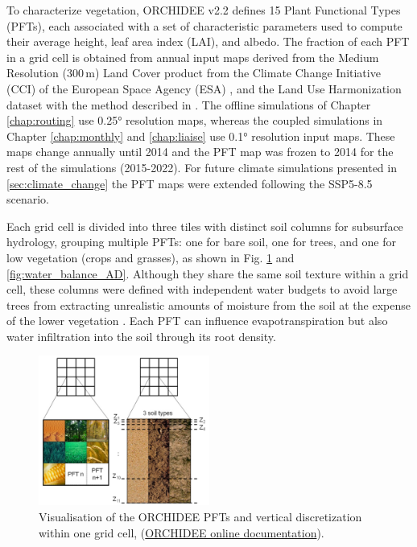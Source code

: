 To characterize vegetation, ORCHIDEE v2.2 defines 15 Plant Functional Types (PFTs), each associated with a set of characteristic parameters used to compute their average height, leaf area index (LAI), and albedo. 
The fraction of each PFT in a grid cell is obtained from annual input maps derived from the Medium Resolution (300\,m) Land Cover product from the Climate Change Initiative (CCI) of the European Space Agency (ESA) \citep{bontemps_multi-year_2015}, and the Land Use Harmonization dataset \citep[LUH, ][]{hurtt_harmonization_2020} with the method described in \citet{lurton_implementation_2020}.
The offline simulations of Chapter \ref{chap:routing} use 0.25° resolution maps, whereas the coupled simulations in Chapter \ref{chap:monthly} and \ref{chap:liaise} use 0.1° resolution input maps. These maps change annually until 2014 and the PFT map was frozen to 2014 for the rest of the simulations (2015-2022).
For future climate simulations presented in \ref{sec:climate_change} the PFT maps were extended following the SSP5-8.5 scenario.

Each grid cell is divided into three tiles with distinct soil columns for subsurface hydrology, grouping multiple PFTs: one for bare soil, one for trees, and one for low vegetation (crops and grasses), as shown in Fig. \ref{fig:ORC_discretization} and \ref{fig:water_balance_AD}. 
Although they share the same soil texture within a grid cell, these columns were 
defined with independent water budgets to avoid large trees from extracting unrealistic amounts of moisture from the soil at the expense of the lower vegetation \citep{de1999representation}. Each PFT can influence evapotranspiration but also water infiltration into the soil through its root density.

\begin{figure}[hbtp]
    \centering
    \includegraphics[width=0.5\textwidth]{images/methods/ORC_discretization.png}
    \caption{Visualisation of the ORCHIDEE PFTs and vertical discretization within one grid cell, (\href{https://orchidee.ipsl.fr/introduction/}{ORCHIDEE online documentation}).}
    \label{fig:ORC_discretization}
\end{figure}

